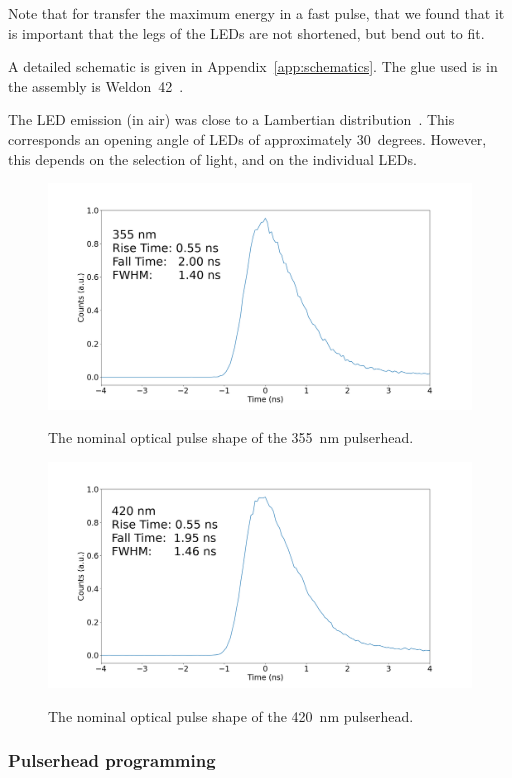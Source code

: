 Note that for transfer the maximum energy in a fast pulse, that we found that it is important that the legs of the LEDs are not shortened, but bend out to fit.

A detailed schematic is given in Appendix~\ref{app:schematics}. The glue used is in the assembly is Weldon~42~\cite{WELDON}.

The LED emission (in air) was close to a Lambertian distribution~\cite{LAMBERTIAN}. This corresponds an opening angle of LEDs of approximately 30~degrees. However, this depends on the selection of light, and on the individual LEDs. 

\begin{figure}
\begin{center}	
  \includegraphics[width=0.60\linewidth]{figures/355_nm_2.png}
  \caption{The nominal optical pulse shape of the 355~nm pulserhead.}
  \label{figure:355nmperf}
  \includegraphics[width=0.60\linewidth]{figures/420_nm_2.png}
  \caption{The nominal optical pulse shape of the 420~nm pulserhead.}
  \label{figure:420nmperf}
\end{center}
\end{figure}


%
%
\subsubsection*{Pulserhead programming}

